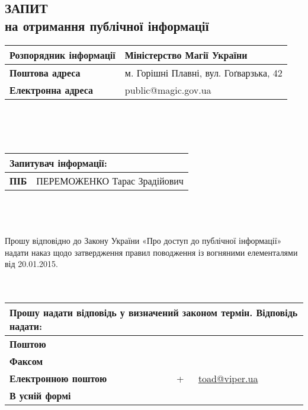 \documentclass[a4paper,12pt]{article}
\newcommand\email[1]{\href{mailto:#1}{#1}}
\begin{document}
  \thispagestyle{empty}
  \subsection*{\centering ЗАПИТ\\на отримання публічної інформації}

  \begin{tabular}{| p{} | p{} |}
    \hline
    \textbf{Розпорядник інформації} & Міністерство Магії України \\
    \hline
    \textbf{Поштова адреса} & м. Горішні Плавні, вул. Гоґварзька, 42 \\
    \hline
    \textbf{Електронна адреса} & public@magic.gov.ua \\
    \hline
  \end{tabular}\\\\\\
  \begin{tabular}{| p{} | p{} |}
    \hline
    \multicolumn{2}{|l|}{\textbf{Запитувач інформації:}} \\
    \hline
    \textbf{ПІБ} & ПЕРЕМОЖЕНКО Тарас Зрадійович \\
    \hline
  \end{tabular}\\\\\\
  Прошу відповідно до Закону України «Про доступ до публічної інформації» надати
  наказ щодо затвердження правил поводження із вогняними елементалями від 20.01.2015. \\
  \\\\
  \begin{tabular}{| p{} | c | p{} |}
    \hline
    \multicolumn{3}{|l|}{\textbf{Прошу надати відповідь у визначений законом термін. Відповідь надати:}} \\
    \hline
    \textbf{Поштою} & & \\
    \hline
    \textbf{Факсом} & & \\
    \hline
    \textbf{Електронною поштою} & + & \email{toad@viper.ua} \\
    \hline
    \textbf{В усній формі} & & \\
    \hline
  \end{tabular}\\\\\\
\end{document}
